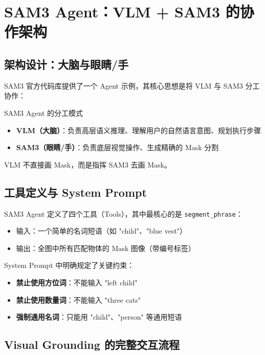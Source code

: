 \section{SAM3 Agent：VLM + SAM3 的协作架构}

\subsection{架构设计：大脑与眼睛/手}

SAM3 官方代码库提供了一个 Agent 示例，其核心思想是将 VLM 与 SAM3 分工协作：

\begin{importantbox}{SAM3 Agent 的分工模式}
\begin{itemize}
    \item \textbf{VLM（大脑）}：负责高层语义推理、理解用户的自然语言意图、规划执行步骤
    \item \textbf{SAM3（眼睛/手）}：负责底层视觉操作、生成精确的 Mask 分割
\end{itemize}
VLM 不直接画 Mask，而是指挥 SAM3 去画 Mask。
\end{importantbox}

\subsection{工具定义与 System Prompt}

SAM3 Agent 定义了四个工具（Tools），其中最核心的是 \texttt{segment\_phrase}：

\begin{itemize}
    \item 输入：一个简单的名词短语（如 "child"、"blue vest"）
    \item 输出：全图中所有匹配物体的 Mask 图像（带编号标签）
\end{itemize}

System Prompt 中明确规定了关键约束：
\begin{itemize}
    \item \textbf{禁止使用方位词}：不能输入 "left child"
    \item \textbf{禁止使用数量词}：不能输入 "three cats"
    \item \textbf{强制通用名词}：只能用 "child"、"person" 等通用短语
\end{itemize}

\subsection{Visual Grounding 的完整交互流程}


